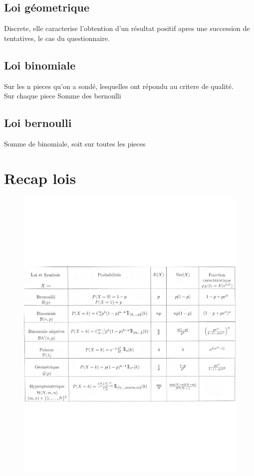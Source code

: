 \documentclass[11pt]{article}
\begin{document}
\subsection{Loi géometrique}
Discrete, elle caracterise l'obtention d'un résultat positif apres une succession de tentatives, le cas du questionnaire.

\subsection{Loi binomiale}
Sur les n pieces qu'on a sondé, lesquelles ont répondu au critere de qualité.\\
Sur chaque piece
Somme des bernoulli

\subsection{Loi bernoulli}
Somme de binomiale, soit sur toutes les pieces


\pagebreak

\section{Recap lois}
\begin{figure}[h!]
    \centering
    \includegraphics[scale=0.8]{img/recap.pdf}
\end{figure}
\end{document}
